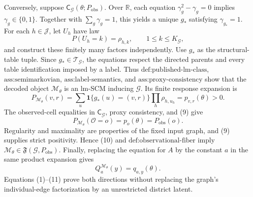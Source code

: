 Conversely, suppose \(\mathsf C_{\mathcal G}(\theta;P_{\mathrm{obs}})\). Over \(\mathbb R\), each equation \(\gamma_g^2-\gamma_g=0\) implies \(\gamma_g\in\{0,1\}\). Together with \(\sum_g\gamma_g=1\), this yields a unique \(g_*\) satisfying \(\gamma_{g_*}=1\). For each \(h\in\mathcal J\), let \(U_h\) have law
\[
P(U_h=k)=\rho_{h,k},
\qquad 1\leq k\leq K_{\mathcal G},
\tag{8}
\]
and construct these finitely many factors independently. Use \(g_*\) as the structural-table tuple. Since \(g_*\in\mathcal T_{\mathcal G}\), the equations respect the directed parents and every table identification imposed by a label. Thus \(\text{def:published-lm-class}\), \(\text{ass:semimarkovian}\), \(\text{ass:label-semantics}\), and \(\text{ass:proxy-consistency}\) show that the decoded object \(\mathcal M_\theta\) is an lm-SCM inducing \(\mathcal G\). Its finite response expansion is
\[
P_{\mathcal M_\theta}(v,r)
=\sum_u\mathbf 1\{g_*(u)=(v,r)\}\prod_h\rho_{h,u_h}
=p_{v,r}(\theta)>0.
\tag{9}
\]
The observed-cell equalities in \(\mathsf C_{\mathcal G}\), proxy consistency, and (9) give
\[
P_{\mathcal M_\theta}(\mathcal O=o)=p_o(\theta)=P_{\mathrm{obs}}(o).
\tag{10}
\]
Regularity and maximality are properties of the fixed input graph, and (9) supplies strict positivity. Hence (10) and \(\text{def:observational-fiber}\) imply \(\mathcal M_\theta\in\mathfrak F(\mathcal G,P_{\mathrm{obs}})\). Finally, replacing the equation for \(A\) by the constant \(a\) in the same product expansion gives
\[
Q_a^{\mathcal M_\theta}(y)=q_{a,y}(\theta).
\tag{11}
\]
Equations (1)--(11) prove both directions without replacing the graph's individual-edge factorization by an unrestricted district latent.